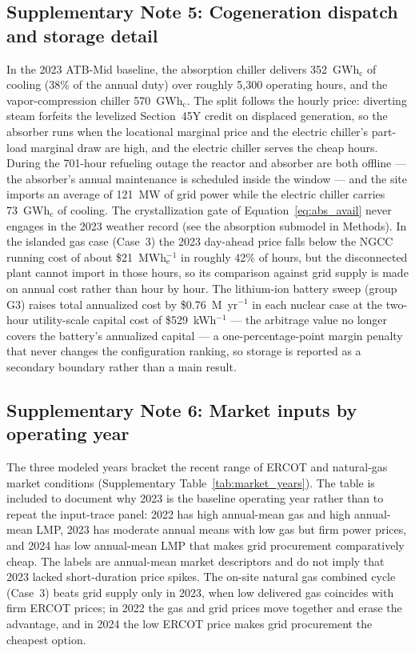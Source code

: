 \documentclass[sn-vancouver,Numbered]{sn-jnl}%
\begin{document}
\subsection*{Supplementary Note 5: Cogeneration dispatch and storage detail}\label{note:dispatch}
In the 2023 ATB-Mid baseline, the absorption chiller delivers 352~GWh$_\mathrm{c}$ of cooling (38\% of the annual duty) over roughly 5{,}300 operating hours, and the vapor-compression chiller 570~GWh$_\mathrm{c}$. The split follows the hourly price: diverting steam forfeits the levelized Section~45Y credit on displaced generation, so the absorber runs when the locational marginal price and the electric chiller's part-load marginal draw are high, and the electric chiller serves the cheap hours. During the 701-hour refueling outage the reactor and absorber are both offline — the absorber's annual maintenance is scheduled inside the window — and the site imports an average of 121~MW of grid power while the electric chiller carries 73~GWh$_\mathrm{c}$ of cooling. The crystallization gate of Equation~\eqref{eq:abs_avail} never engages in the 2023 weather record (see the absorption submodel in Methods). In the islanded gas case (Case~3) the 2023 day-ahead price falls below the NGCC running cost of about \$21~MWh$_\mathrm{e}^{-1}$ in roughly 42\% of hours, but the disconnected plant cannot import in those hours, so its comparison against grid supply is made on annual cost rather than hour by hour. The lithium-ion battery sweep (group G3) raises total annualized cost by \$0.76~M~yr$^{-1}$ in each nuclear case at the two-hour utility-scale capital cost of \$529~kWh$^{-1}$ — the arbitrage value no longer covers the battery's annualized capital — a one-percentage-point margin penalty that never changes the configuration ranking, so storage is reported as a secondary boundary rather than a main result.

\subsection*{Supplementary Note 6: Market inputs by operating year}\label{note:market}
The three modeled years bracket the recent range of ERCOT and natural-gas market conditions (Supplementary Table~\ref{tab:market_years}). The table is included to document why 2023 is the baseline operating year rather than to repeat the input-trace panel: 2022 has high annual-mean gas and high annual-mean LMP, 2023 has moderate annual means with low gas but firm power prices, and 2024 has low annual-mean LMP that makes grid procurement comparatively cheap. The labels are annual-mean market descriptors and do not imply that 2023 lacked short-duration price spikes. The on-site natural gas combined cycle (Case~3) beats grid supply only in 2023, when low delivered gas coincides with firm ERCOT prices; in 2022 the gas and grid prices move together and erase the advantage, and in 2024 the low ERCOT price makes grid procurement the cheapest option.
\end{document}
